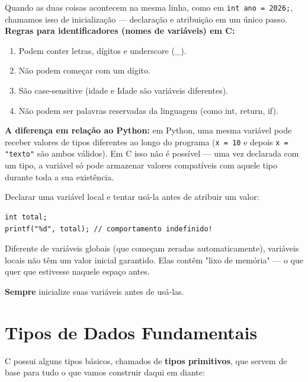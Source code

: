 Quando as duas coisas acontecem na mesma linha, como em \texttt{int ano = 2026;}, chamamos isso de inicialização — declaração e atribuição em um único passo. \\

\textbf{Regras para identificadores (nomes de variáveis) em C:}

\begin{enumerate}
    \item Podem conter letras, dígitos e underscore (\_).
    \item Não podem começar com um dígito.
    \item São case-sensitive (idade e Idade são variáveis diferentes).
    \item Não podem ser palavras reservadas da linguagem (como int, return, if).
\end{enumerate}

\textbf{A diferença em relação ao Python:} 
em Python, uma mesma variável pode receber valores de tipos diferentes ao longo do programa (\texttt{x = 10} e depois \texttt{x = "texto"} são ambos válidos). Em C isso não é possível — uma vez declarada com um tipo, a variável só pode armazenar valores compatíveis com aquele tipo durante toda a sua existência.


\begin{errocomum}

Declarar uma variável local e tentar usá-la antes de atribuir um valor:

\begin{lstlisting}
int total;
printf("%d", total); // comportamento indefinido!

\end{lstlisting}

Diferente de variáveis globais (que começam zeradas automaticamente), variáveis locais não têm um valor inicial garantido. Elas contêm "lixo de memória" — o que quer que estivesse naquele espaço antes. 

\textbf{Sempre} inicialize suas variáveis antes de usá-las.

    
\end{errocomum}



\section{Tipos de Dados Fundamentais}
C possui alguns tipos básicos, chamados de \textbf{tipos primitivos}, que servem de base para tudo o que vamos construir daqui em diante:

